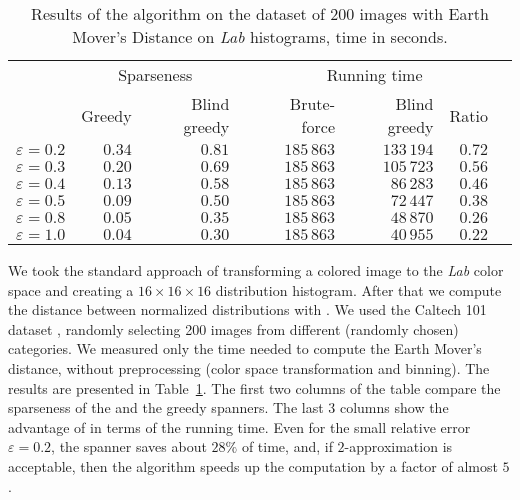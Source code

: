 \documentclass{ws-ijcga}
\newcommand{\eps}{\varepsilon}
\begin{document}
\begin{table}\centering
    \begin{tabular}{@{}rrrcrrrc@{}}\toprule
        & \multicolumn{2}{c}{Sparseness} & \phantom{abc} & \multicolumn{3}{c}{Running time} \\
        \cmidrule{2-3} \cmidrule{5-7} 
                & Greedy  & Blind greedy && Brute-force & Blind greedy & Ratio \\ \midrule
$\eps = 0.2$    &   $0.34$  &  $0.81$    &&  $185\,863$   & $133\,194$    & $0.72$   \\
$\eps = 0.3$    &   $0.20$  &  $0.69$    &&  $185\,863$   & $105\,723$    & $0.56$   \\
$\eps = 0.4$    &   $0.13$  &  $0.58$    &&  $185\,863$   & $86\,283$    & $0.46$   \\
$\eps = 0.5$    &   $0.09$  &  $0.50$    &&  $185\,863$   & $72\,447$    & $0.38$   \\
$\eps = 0.8$    &   $0.05$  &  $0.35$    &&  $185\,863$   & $48\,870$    & $0.26$   \\
$\eps = 1.0$    &   $0.04$  &  $0.30$    &&  $185\,863$   & $40\,955$    & $0.22$   \\
\bottomrule
\end{tabular}
    \caption{Results of the \bgrdy algorithm on the dataset of 200 images
    with Earth Mover's Distance on \textit{Lab} histograms, time in seconds.}
\label{tbl:emd_lab_caltech}
\end{table}

We took the standard approach \cite{rubner2000earth} of transforming a colored image
to the \textit{Lab} color space and creating a $16\times 16\times 16$
distribution histogram. After that we compute the distance between normalized
distributions with \cite{doran_pyemd}.
We used the Caltech 101 dataset \cite{caltech101},
randomly selecting 200 images from different (randomly chosen)
categories.  We measured only the time needed to compute
the Earth Mover's distance, without preprocessing (color space transformation
and binning). The results are presented in Table~\ref{tbl:emd_lab_caltech}.
The first two columns of the table compare the sparseness of the \bgrdy and the greedy spanners.
The last 3 columns show the advantage
of \bgrdy in terms of the running time.
Even for the small relative error $\eps = 0.2$,
the \bgrdy spanner saves about $28\%$ of time,
and, if {$2$-approximation} is acceptable,
then the \bgrdy algorithm speeds up
the computation by a factor of almost $5$.
\end{document}

